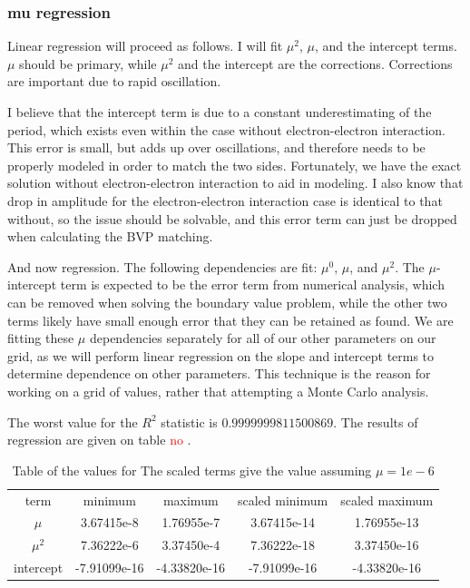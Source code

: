 \documentclass[A4,12pt,oneside]{article}
\renewcommand{\(}{\left(}
\renewcommand{\)}{\right)}
\newcommand{\refph}{\textcolor{red}{no }}
\begin{document}
\subsubsection{mu regression}
Linear regression will proceed as follows. I will fit $\mu^2$, $\mu$, and the intercept terms. $\mu$ should be primary, while $\mu^2$ and the intercept are the corrections. Corrections are important due to rapid oscillation.

I believe that the intercept term is due to a constant underestimating of the period, which exists even within the case without electron-electron interaction. This error is small, but adds up over oscillations, and therefore needs to be properly modeled in order to match the two sides. Fortunately, we have the exact solution without electron-electron interaction to aid in modeling. I also know that drop in amplitude for the electron-electron interaction case is identical to that without, so the issue should be solvable, and this error term can just be dropped when calculating the BVP matching.

And now regression. The following dependencies are fit: $\mu^0$, $\mu$, and $\mu^2$. The $\mu$-intercept term is expected to be the error term from numerical analysis, which can be removed when solving the boundary value problem, while the other two terms likely have small enough error that they can be retained as found. We are fitting these $\mu$ dependencies separately for all of our other parameters on our grid, as we will perform linear regression on the slope and intercept terms to determine dependence on other parameters. This technique is the reason for working on a grid of values, rather that attempting a Monte Carlo analysis.

The worst value for the $R^2$ statistic is $0.9999999811500869$. The results of regression are given on table \refph . 

\begin{table}
\begin{center}
\begin{tabular}{ c c c c c }
 term      & minimum      & maximum      & scaled minimum & scaled maximum \\ 
 $\mu$     &  3.67415e-8  &  1.76955e-7  &  3.67415e-14   &  1.76955e-13\\  
 $\mu^2$   &  7.36222e-6  &  3.37450e-4  &  7.36222e-18   &  3.37450e-16\\  
 intercept & -7.91099e-16 & -4.33820e-16 & -7.91099e-16   & -4.33820e-16
\end{tabular}
\end{center}
\caption{
Table of the values for 
The scaled terms give the value assuming $\mu = 1e-6$
}
\end{table}
\end{document}

